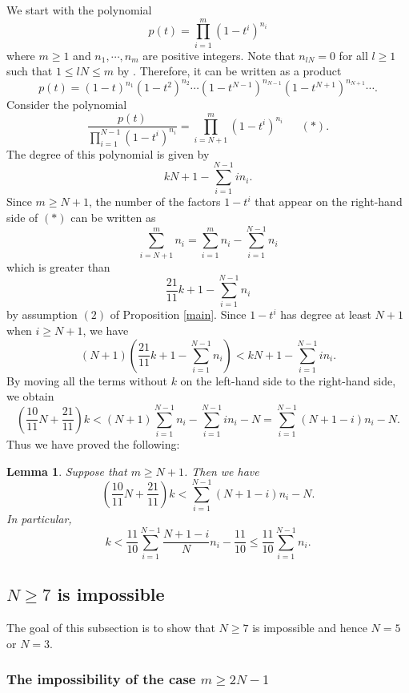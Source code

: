 \documentclass[reqno]{amsart}
\numberwithin{equation}{section}
\theoremstyle{plain}
\newtheorem{lem}[equation]{Lemma}
\theoremstyle{definition}
\begin{document}
We start with the polynomial
$$p(t)=\prod^m_{i=1}(1-t^i)^{n_i}$$
where $m\geq1$ and $n_1, \cdots, n_m$ are positive integers. Note that $n_{lN}=0$ for all $l\geq 1$ such that $1\leq lN\leq m$ by \cite[Proposition 3.3]{Kabbaj}. Therefore, it can be written as a product
$$p(t)=(1-t)^{n_1}(1-t^2)^{n_2}\cdots(1-t^{N-1})^{n_{N-1}}(1-t^{N+1})^{n_{N+1}}\cdots.$$
Consider the polynomial
$$\frac{p(t)}{\prod_{i=1}^{N-1}(1-t^i)^{n_i}}=\prod_{i=N+1}^m(1-t^i)^{n_i}\ \ \ \ \ \ \ (*).$$
The degree of this polynomial is given by 
$$kN+1-\sum^{N-1}_{i=1}in_i.$$
Since $m\geq N+1$, the number of the factors $1-t^i$ that appear on the right-hand side of $(*)$ can be written as 
$$\sum^{m}_{i=N+1}n_i=\sum^{m}_{i=1}n_i-\sum^{N-1}_{i=1}n_i$$
which is greater than 
$$\frac{21}{11}k+1-\sum^{N-1}_{i=1}n_i$$
by assumption $(2)$ of Proposition \ref{main}. Since $1-t^i$ has degree at least $N+1$ when $i\geq N+1$, we have 
$$(N+1)\left(\frac{21}{11}k+1-\sum^{N-1}_{i=1}n_i\right)< kN+1-\sum^{N-1}_{i=1}in_i.$$
By moving all the terms without $k$ on the left-hand side to the right-hand side, we obtain
$$\left(\frac{10}{11}N+\frac{21}{11}\right)k< (N+1)\sum^{N-1}_{i=1}n_i-\sum^{N-1}_{i=1}in_i-N=\sum^{N-1}_{i=1}(N+1-i)n_i-N.$$
Thus we have proved the following:
\begin{lem}\label{lockout}
    Suppose that $m\geq N+1$. Then we have 
$$\left(\frac{10}{11}N+\frac{21}{11}\right)k<\sum^{N-1}_{i=1}(N+1-i)n_i-N.$$
   In particular,
$$k<\frac{11}{10}\sum^{N-1}_{i=1}\frac{N+1-i}{N}n_i-\frac{11}{10}\leq\frac{11}{10}\sum^{N-1}_{i=1}n_i.$$
\end{lem}

\subsection{$N\geq7$ is impossible}

The goal of this subsection is to show that $N\geq 7$ is impossible and hence $N=5$ or $N=3$.

\subsubsection{The impossibility of the case $m\geq 2N-1$}\label{7m>2N-1imp}

\end{document}
